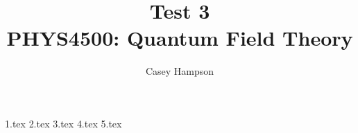 \documentclass[titlepage]{article}
\title{Test 3 \\[5pt] PHYS4500: Quantum Field Theory}
\author{Casey Hampson}
\begin{document}
    \maketitle
    \pagebreak

    {1.tex}
    {2.tex}
    {3.tex}
    {4.tex}
    {5.tex}
\end{document}
